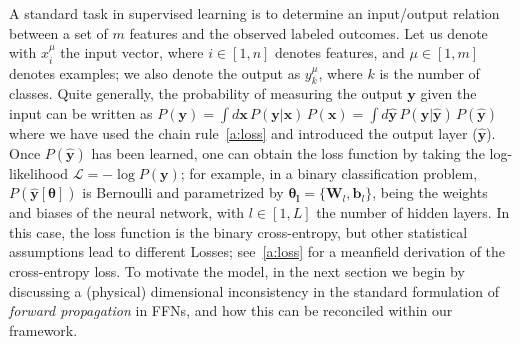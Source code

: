 \documentclass{article}
\begin{document}
A standard task in supervised learning is to determine an input/output relation between a set of $m$ features and the observed labeled outcomes. Let us denote with $x^{\mu}_i$ the input vector, where $i \in [1, n]$ denotes features, and $\mu \in [1,m]$ denotes examples; we also denote the output as $y^{\mu}_k$, where $k$ is the number of classes. Quite generally, the probability of measuring the output $\mathbf{y}$ given the input can be written as $P(\mathbf{y}) = \int d\mathbf{x} \, P(\mathbf{y} | \mathbf{x}) \, P(\mathbf{x})  =  \int d \hat{\mathbf{y}} \, P(\mathbf{y} | \hat{\mathbf{y}} ) \, P(\hat{\mathbf{y}})$ where we have used the chain rule~\eqref{a:loss} and introduced the output layer ($\hat{ \mathbf{y}}$). Once $P(\hat{\mathbf{y}})$ has been learned, one can obtain the loss function by taking the log-likelihood $\mathscr{L} = - \log P(\mathbf{y})$; for example, in a binary classification problem, $P(\hat{\mathbf{y}}[\boldsymbol{\theta}])$ is Bernoulli and parametrized by $\boldsymbol{\theta_l} = \{\mathbf{W}_l,\mathbf{ b}_l \}$, being the weights and biases of the neural network, with $l \in [1, L]$ the number of hidden layers. In this case, the loss function is the binary cross-entropy, but other statistical assumptions lead to different Losses; see~\eqref{a:loss} for a meanfield derivation of the cross-entropy loss. To motivate the model, in the next section we begin by discussing a (physical) dimensional inconsistency in the standard formulation of {\it forward propagation} in FFNs, and how this can be reconciled within our framework.
%
\end{document}
